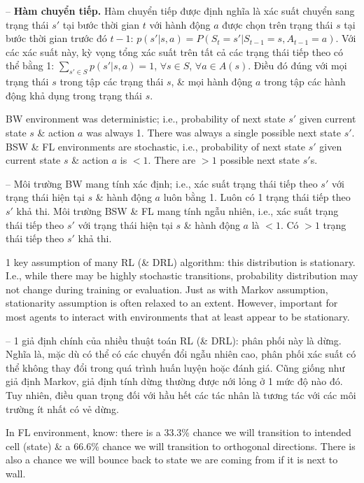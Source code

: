 \documentclass{article}
\begin{document}
\begin{itemize}
\begin{itemize}
        -- {\bf Hàm chuyển tiếp.} Hàm chuyển tiếp được định nghĩa là xác suất chuyển sang trạng thái $s'$ tại bước thời gian $t$ với hành động $a$ được chọn trên trạng thái $s$ tại bước thời gian trước đó $t - 1$: $p(s'|s,a) = P(S_t = s'|S_{t-1} = s,A_{t-1} = a)$. Với các xác suất này, kỳ vọng tổng xác suất trên tất cả các trạng thái tiếp theo có thể bằng 1: $\sum_{s'\in S} p(s'|s,a) = 1$, $\forall s\in S$, $\forall a\in A(s)$. Điều đó đúng với mọi trạng thái $s$ trong tập các trạng thái $s$, \& mọi hành động $a$ trong tập các hành động khả dụng trong trạng thái $s$.

        BW environment was deterministic; i.e., probability of next state $s'$ given current state $s$ \& action $a$ was always 1. There was always a single possible next state $s'$. BSW \& FL environments are stochastic, i.e., probability of next state $s'$ given current state $s$ \& action $a$ is $< 1$. There are $> 1$ possible next state $s'$s.

        -- Môi trường BW mang tính xác định; i.e., xác suất trạng thái tiếp theo $s'$ với trạng thái hiện tại $s$ \& hành động $a$ luôn bằng 1. Luôn có 1 trạng thái tiếp theo $s'$ khả thi. Môi trường BSW \& FL mang tính ngẫu nhiên, i.e., xác suất trạng thái tiếp theo $s'$ với trạng thái hiện tại $s$ \& hành động $a$ là $< 1$. Có $> 1$ trạng thái tiếp theo $s'$ khả thi.

        1 key assumption of many RL  (\& DRL) algorithm: this distribution is stationary. I.e., while there may be highly stochastic transitions, probability distribution may not change during training or evaluation. Just as with Markov assumption, stationarity assumption is often relaxed to an extent. However, important for most agents to interact with environments that at least appear to be stationary.

        -- 1 giả định chính của nhiều thuật toán RL (\& DRL): phân phối này là dừng. Nghĩa là, mặc dù có thể có các chuyển đổi ngẫu nhiên cao, phân phối xác suất có thể không thay đổi trong quá trình huấn luyện hoặc đánh giá. Cũng giống như giả định Markov, giả định tính dừng thường được nới lỏng ở 1 mức độ nào đó. Tuy nhiên, điều quan trọng đối với hầu hết các tác nhân là tương tác với các môi trường ít nhất có vẻ dừng.

        In FL environment, know: there is a 33.3\% chance we will transition to intended cell (state) \& a 66.6\% chance we will transition to orthogonal directions. There is also a chance we will bounce back to state we are coming from if it is next to wall.


\end{itemize}
\end{itemize}
\end{document}
